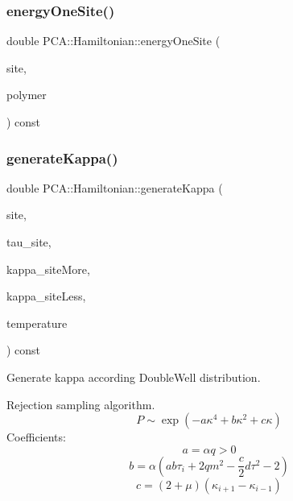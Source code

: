 \hypertarget{class_p_c_a_1_1_hamiltonian_aaf2a99fc482ccd2ebb0dc671f1a8df5a}{}\label{class_p_c_a_1_1_hamiltonian_aaf2a99fc482ccd2ebb0dc671f1a8df5a} 
\subsubsection{\texorpdfstring{energy\+One\+Site()}{energyOneSite()}}
{\footnotesize\ttfamily double P\+C\+A\+::\+Hamiltonian\+::energy\+One\+Site (\begin{DoxyParamCaption}\item[{int}]{site,  }\item[{const \hyperlink{class_p_c_a_1_1_polymer_m_c}{Polymer\+MC} \&}]{polymer }\end{DoxyParamCaption}) const}

\hypertarget{class_p_c_a_1_1_hamiltonian_a89970a467d0ca05c41361fdd349a9ec7}{}\label{class_p_c_a_1_1_hamiltonian_a89970a467d0ca05c41361fdd349a9ec7} 
\subsubsection{\texorpdfstring{generate\+Kappa()}{generateKappa()}}
{\footnotesize\ttfamily double P\+C\+A\+::\+Hamiltonian\+::generate\+Kappa (\begin{DoxyParamCaption}\item[{int}]{site,  }\item[{double}]{tau\+\_\+site,  }\item[{double}]{kappa\+\_\+site\+More,  }\item[{double}]{kappa\+\_\+site\+Less,  }\item[{double}]{temperature }\end{DoxyParamCaption}) const}



Generate kappa according Double\+Well distribution. 

Rejection sampling algorithm. \[P\sim \exp\left( -a\kappa^4+b\kappa^2+c\kappa\right)\] Coefficients\+: \[a = \alpha q > 0\] \[b = \alpha(ab\tau_i+2qm^2-\frac{c}{2}d\tau^2-2)\] \[c = (2+\mu)(\kappa_{i+1}-\kappa_{i-1})\] \hypertarget{class_p_c_a_1_1_hamiltonian_a4da405a227d850e6e50c87889d4cd360}{}\label{class_p_c_a_1_1_hamiltonian_a4da405a227d850e6e50c87889d4cd360} 
